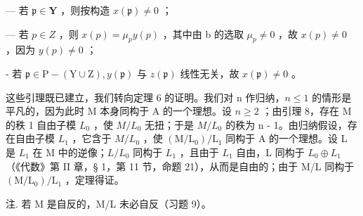 --- 若 \(\mathfrak{p} \in \mathbf{Y}\) ，则按构造 \(x(\mathfrak{p}) \neq 0\) ；

--- 若 \(p \in Z\) ，则 \(x(p) = \mu_{p} y(p)\) ，其中由 b 的选取 \(\mu_{p} \neq 0\) ，故 \(x(p) \neq 0\) ，因为 \(y(p) \neq 0\) ；

- 若 \(\mathfrak{p} \in \mathrm{P} - (\mathrm{Y} \cup \mathrm{Z}), y(\mathfrak{p})\) 与 \(z(\mathfrak{p})\) 线性无关，故 \(x(\mathfrak{p}) \neq 0\) 。

这些引理既已建立，我们转向定理 6 的证明。我们对 n 作归纳，\(n \leqslant 1\) 的情形是平凡的，因为此时 M 本身同构于 A 的一个理想。设 \(n \geqslant 2\) ；由引理 8，存在 M 的秩 1 自由子模 \(L_{0}\) ，使 \(M/L_{0}\) 无扭；于是 \(M/L_{0}\) 的秩为 n - 1。由归纳假设，存在自由子模 \(L_{1}\) ，它含于 \(M/L_{0}\) ，使 \((\mathrm{M}/\mathrm{L}_{0})/\mathrm{L}_{1}\) 同构于 A 的一个理想。设 L 是 \(L_{1}\) 在 M 中的逆像；\(L/L_{0}\) 同构于 \(L_{1}\) ，且由于 \(L_{1}\) 自由，L 同构于 \(L_{0} \oplus L_{1}\) （《代数》第 II 章，§ 1，第 11 节，命题 21），从而是自由的；由于 M/L 同构于 \((\mathrm{M}/\mathrm{L}_{0})/\mathrm{L}_{1}\) ，定理得证。

注. 若 M 是自反的，M/L 未必自反（习题 9）。

